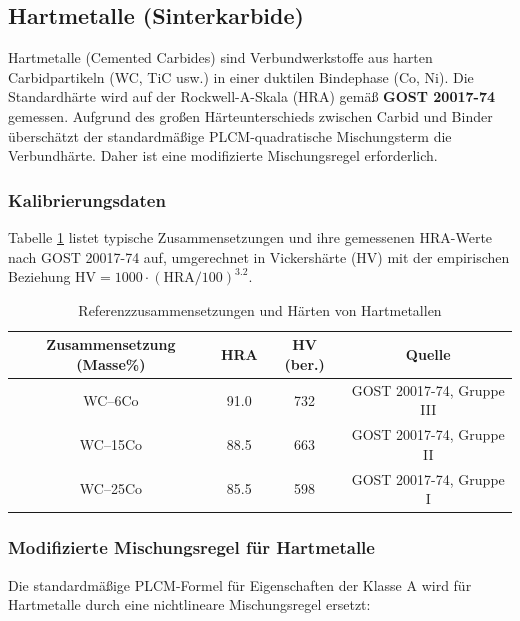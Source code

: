 \documentclass[12pt,a4paper]{article}
\begin{document}
	
	\subsection{Hartmetalle (Sinterkarbide)}
	\label{subsec:hardmetals}
	
	Hartmetalle (Cemented Carbides) sind Verbundwerkstoffe aus harten Carbidpartikeln (WC, TiC usw.) in einer duktilen Bindephase (Co, Ni). Die Standardhärte wird auf der Rockwell-A-Skala (HRA) gemäß \textbf{GOST 20017-74} gemessen. Aufgrund des großen Härteunterschieds zwischen Carbid und Binder überschätzt der standardmäßige PLCM-quadratische Mischungsterm die Verbundhärte. Daher ist eine modifizierte Mischungsregel erforderlich.
	
	\subsubsection{Kalibrierungsdaten}
	Tabelle \ref{tab:hardmetal_compositions} listet typische Zusammensetzungen und ihre gemessenen HRA-Werte nach GOST 20017-74 auf, umgerechnet in Vickershärte (HV) mit der empirischen Beziehung $\text{HV} = 1000 \cdot (\text{HRA}/100)^{3.2}$.
	
	\begin{table}[htbp]
		\centering
		\caption{Referenzzusammensetzungen und Härten von Hartmetallen}
		\label{tab:hardmetal_compositions}
		\begin{tabular}{cccc}
			\toprule
			\textbf{Zusammensetzung (Masse\%)} & \textbf{HRA} & \textbf{HV (ber.)} & \textbf{Quelle} \\
			\midrule
			WC–6Co & 91.0 & 732 & GOST 20017-74, Gruppe III \\
			WC–15Co & 88.5 & 663 & GOST 20017-74, Gruppe II \\
			WC–25Co & 85.5 & 598 & GOST 20017-74, Gruppe I \\
			\bottomrule
		\end{tabular}
	\end{table}
	
	\subsubsection{Modifizierte Mischungsregel für Hartmetalle}
	Die standardmäßige PLCM-Formel für Eigenschaften der Klasse A wird für Hartmetalle durch eine nichtlineare Mischungsregel ersetzt:
	
\end{document}
